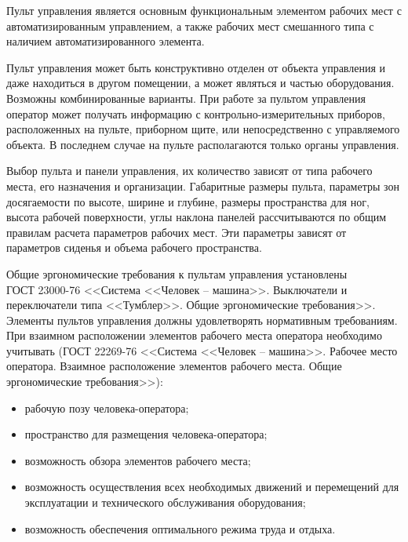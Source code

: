         Пульт управления является основным функциональным элементом рабочих
        мест с автоматизированным управлением, а также рабочих мест смешанного
        типа с наличием автоматизированного элемента.

        Пульт управления может быть конструктивно отделен от объекта управления
        и даже находиться в другом помещении, а может являться и частью
        оборудования. Возможны комбинированные варианты. При работе за пультом
        управления оператор может получать информацию с
        контрольно-измерительных приборов, расположенных на пульте, приборном
        щите, или непосредственно с управляемого объекта. В последнем случае на
        пульте располагаются только органы управления. 

        Выбор пульта и панели управления, их количество зависят от типа
        рабочего места, его назначения и организации. Габаритные размеры
        пульта, параметры зон досягаемости по высоте, ширине и глубине, размеры
        пространства для ног, высота рабочей поверхности, углы наклона панелей
        рассчитываются по общим правилам расчета параметров рабочих мест. Эти
        параметры зависят от параметров сиденья и объема рабочего пространства.

        Общие эргономические требования к пультам управления установлены \\
        ГОСТ 23000-76 <<Система <<Человек -- машина>>. Выключатели и
        переключатели типа <<Тумблер>>. Общие эргономические требования>>.
        Элементы пультов управления должны удовлетворять нормативным
        требованиям. При взаимном расположении элементов рабочего места
        оператора необходимо учитывать (ГОСТ 22269-76 <<Система <<Человек –
        машина>>. Рабочее место оператора.  Взаимное расположение элементов
        рабочего места. Общие эргономические требования>>):

        \begin{itemize}
            \item рабочую позу человека-оператора;
            \item пространство для размещения человека-оператора;
            \item возможность обзора элементов рабочего места;
            \item возможность осуществления всех необходимых движений
                и перемещений для эксплуатации и технического обслуживания
                оборудования;
            \item возможность обеспечения оптимального режима труда и отдыха.
        \end{itemize}

